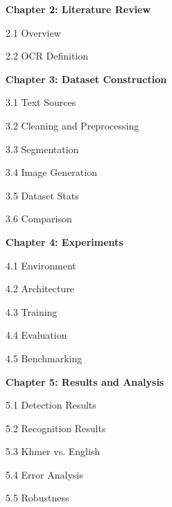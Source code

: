 \begin{adjustwidth}{0.2cm}{0.2cm}
    \vspace{0.5cm}
    {\large \textbf{Chapter 2: Literature Review}\dotfill\pageref{ch:literature}\par}
    {\large 2.1 Overview\dotfill\pageref{sec:ocr-overview}\par}
    {\large 2.2 OCR Definition\dotfill\pageref{sec:ocr-definition}\par}

    \vspace{0.5cm}
    {\large \textbf{Chapter 3: Dataset Construction}\dotfill\pageref{ch:dataset}\par}
    {\large 3.1 Text Sources\dotfill\pageref{sec:text-source}\par}
    {\large 3.2 Cleaning and Preprocessing\dotfill\pageref{sec:preprocessing}\par}
    {\large 3.3 Segmentation\dotfill\par}
    {\large 3.4 Image Generation\dotfill\par}
    {\large 3.5 Dataset Stats\dotfill\par}
    {\large 3.6 Comparison\dotfill\par}

    \vspace{0.5cm}
    {\large \textbf{Chapter 4: Experiments}\dotfill\pageref{ch:experiments}\par}
    {\large 4.1 Environment\dotfill\pageref{sec:environment}\par}
    {\large 4.2 Architecture\dotfill\pageref{sec:architecture}\par}
    {\large 4.3 Training\dotfill\pageref{sec:training}\par}
    {\large 4.4 Evaluation\dotfill\pageref{sec:metrics}\par}
    {\large 4.5 Benchmarking\dotfill\par}

    \vspace{0.5cm}
    {\large \textbf{Chapter 5: Results and Analysis}\dotfill\pageref{ch:results}\par}
    {\large 5.1 Detection Results\dotfill\pageref{sec:detection-results}\par}
    {\large 5.2 Recognition Results\dotfill\pageref{sec:recognition-results}\par}
    {\large 5.3 Khmer vs. English\dotfill\par}
    {\large 5.4 Error Analysis\dotfill\pageref{sec:error-analysis}\par}
    {\large 5.5 Robustness\dotfill\pageref{sec:robustness}\par}


\end{adjustwidth}
